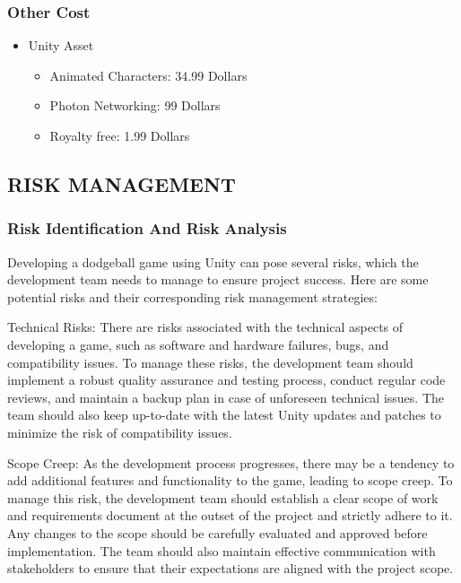 \documentclass[12pt]{report}
\begin{document}
\subsubsection{Other Cost}
\justifying
\setlength{\parindent}{4em}
\setlength{\parskip}{0.5em}
\renewcommand{\baselinestretch}{1.5}
\vspace{0.1cm}
\begin{itemize}
\item Unity Asset
\begin{itemize}
\item Animated Characters: 34.99 Dollars
\item Photon Networking: 99 Dollars
\item Royalty free:  1.99 Dollars
\end{itemize}
\end{itemize}

\subsection{RISK MANAGEMENT}
\justifying
\setlength{\parindent}{4em}
\setlength{\parskip}{0.5em}
\renewcommand{\baselinestretch}{1.5}
\vspace{0.1cm}

\subsubsection{Risk Identification And Risk Analysis}
\justifying
\setlength{\parindent}{2em}
\setlength{\parskip}{0.5em}
\renewcommand{\baselinestretch}{1.5}
\vspace{0.1cm}
\normalsize
Developing a dodgeball game using Unity can pose several risks, which the development team needs to manage to ensure project success. Here are some potential risks and their corresponding risk management strategies:

Technical Risks: There are risks associated with the technical aspects of developing a game, such as software and hardware failures, bugs, and compatibility issues. To manage these risks, the development team should implement a robust quality assurance and testing process, conduct regular code reviews, and maintain a backup plan in case of unforeseen technical issues. The team should also keep up-to-date with the latest Unity updates and patches to minimize the risk of compatibility issues.

Scope Creep: As the development process progresses, there may be a tendency to add additional features and functionality to the game, leading to scope creep. To manage this risk, the development team should establish a clear scope of work and requirements document at the outset of the project and strictly adhere to it. Any changes to the scope should be carefully evaluated and approved before implementation. The team should also maintain effective communication with stakeholders to ensure that their expectations are aligned with the project scope.
\end{document}
